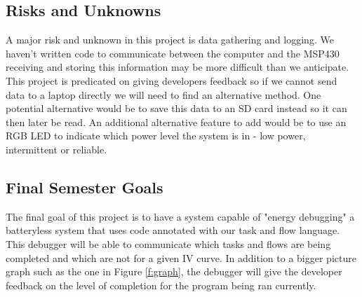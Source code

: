 \subsection{Risks and Unknowns}
A major risk and unknown in this project is data gathering and logging.
We haven't written code to communicate between the computer and the MSP430 receiving and storing this information may be more difficult than we anticipate.
This project is predicated on giving developers feedback so if we cannot send data to a laptop directly we will need to find an alternative method.
One potential alternative would be to save this data to an SD card instead so it can then later be read.
An additional alternative feature to add would be to use an RGB LED to indicate which power level the system is in - low power, intermittent or reliable.

\subsection{Final Semester Goals}
The final goal of this project is to have a system capable of "energy debugging" a batteryless system that uses code annotated with our task and flow language.
This debugger will be able to communicate which tasks and flows are being completed and which are not for a given IV curve.
In addition to a bigger picture graph such as the one in Figure \ref{f:graph}, the debugger will give the developer feedback on the level of completion for the program being ran currently.
